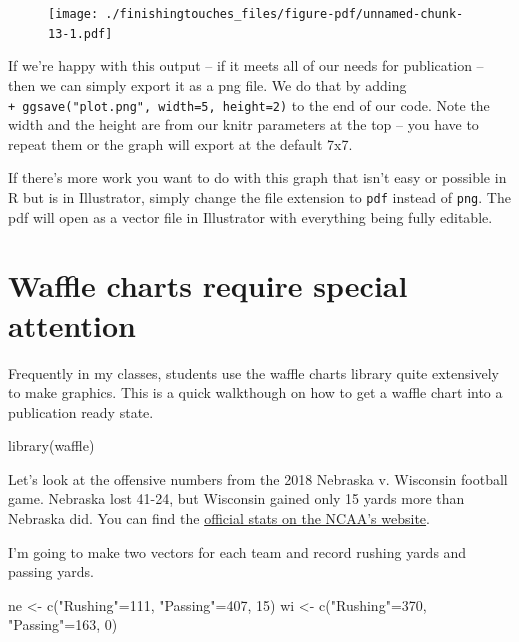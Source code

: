 \documentclass[
  letterpaper,
  DIV=11,
  numbers=noendperiod]{scrreprt}
\newenvironment{Shaded}{\begin{snugshade}}{\end{snugshade}}
\newcommand{\DecValTok}[1]{\textcolor[rgb]{0.68,0.00,0.00}{#1}}
\newcommand{\FunctionTok}[1]{\textcolor[rgb]{0.28,0.35,0.67}{#1}}
\newcommand{\NormalTok}[1]{\textcolor[rgb]{0.00,0.23,0.31}{#1}}
\newcommand{\OtherTok}[1]{\textcolor[rgb]{0.00,0.23,0.31}{#1}}
\newcommand{\StringTok}[1]{\textcolor[rgb]{0.13,0.47,0.30}{#1}}
\begin{document}
\begin{figure}[H]

{\centering \texttt{[image: ./finishingtouches\_files/figure-pdf/unnamed-chunk-13-1.pdf]}

}

\end{figure}

If we're happy with this output -- if it meets all of our needs for
publication -- then we can simply export it as a png file. We do that by
adding \texttt{+\ ggsave("plot.png",\ width=5,\ height=2)} to the end of
our code. Note the width and the height are from our knitr parameters at
the top -- you have to repeat them or the graph will export at the
default 7x7.

If there's more work you want to do with this graph that isn't easy or
possible in R but is in Illustrator, simply change the file extension to
\texttt{pdf} instead of \texttt{png}. The pdf will open as a vector file
in Illustrator with everything being fully editable.

\hypertarget{waffle-charts-require-special-attention}{%
\section{Waffle charts require special
attention}\label{waffle-charts-require-special-attention}}

Frequently in my classes, students use the waffle charts library quite
extensively to make graphics. This is a quick walkthough on how to get a
waffle chart into a publication ready state.

\begin{Shaded}
\begin{Highlighting}[]
\FunctionTok{library}\NormalTok{(waffle)}
\end{Highlighting}
\end{Shaded}

Let's look at the offensive numbers from the 2018 Nebraska v. Wisconsin
football game. Nebraska lost 41-24, but Wisconsin gained only 15 yards
more than Nebraska did. You can find the
\href{https://www.ncaa.com/game/football/fbs/2018/10/06/nebraska-wisconsin/team-stats}{official
stats on the NCAA's website}.

I'm going to make two vectors for each team and record rushing yards and
passing yards.

\begin{Shaded}
\begin{Highlighting}[]
\NormalTok{ne }\OtherTok{\textless{}{-}} \FunctionTok{c}\NormalTok{(}\StringTok{"Rushing"}\OtherTok{=}\DecValTok{111}\NormalTok{, }\StringTok{"Passing"}\OtherTok{=}\DecValTok{407}\NormalTok{, }\DecValTok{15}\NormalTok{)}
\NormalTok{wi }\OtherTok{\textless{}{-}} \FunctionTok{c}\NormalTok{(}\StringTok{"Rushing"}\OtherTok{=}\DecValTok{370}\NormalTok{, }\StringTok{"Passing"}\OtherTok{=}\DecValTok{163}\NormalTok{, }\DecValTok{0}\NormalTok{)}
\end{Highlighting}
\end{Shaded}
\end{document}
